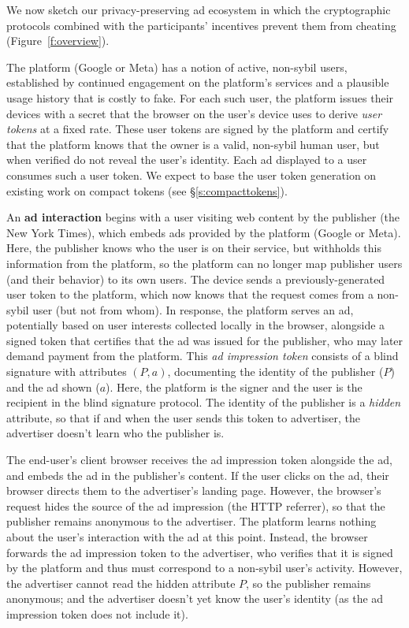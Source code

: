 %
We now sketch our privacy-preserving ad ecosystem in which the cryptographic protocols combined with the participants' incentives prevent them from cheating (Figure~\ref{f:overview}).
%

%
The platform (\eg Google or Meta) has a notion of active, non-sybil users, established \eg by continued engagement on the platform's services and a plausible usage history that is costly to fake.
%
For each such user, the platform issues their devices with a secret that the browser on the user's device uses to derive \emph{user tokens} at a fixed rate.
%
These user tokens are signed by the platform and certify that the platform knows that the owner is a valid, non-sybil human user, but when verified do not reveal the user's identity.
%
Each ad displayed to a user consumes such a user token.
%
We expect to base the user token generation on existing work on compact tokens (see \S\ref{s:compacttokens}).
%

%
An \textbf{ad interaction} begins with a user visiting web content by the publisher (\eg the New York Times), which embeds ads provided by the platform (\eg Google or Meta).
%
Here, the publisher knows who the user is on their service, but withholds this information from the platform, so the platform can no longer map publisher users (and their behavior) to its own users.
%
The device sends a previously-generated user token to the platform, which now knows that the request comes from a non-sybil user (but not from whom).
%
In response, the platform serves an ad, potentially based on user interests collected locally in the browser, alongside a signed token that certifies that the ad was issued for the publisher, who may later demand payment from the platform.
%
This \emph{ad impression token} consists of a blind signature with attributes $(P, a)$, documenting the identity of the publisher ($P$) and the ad shown ($a$).
%
Here, the platform is the signer and the user is the recipient in the blind signature protocol.
%
The identity of the publisher is a \emph{hidden} attribute, so that if and when the user sends this token to advertiser, the advertiser doesn't learn who the publisher is.%
%

%
The end-user's client browser receives the ad impression token alongside the ad, and embeds the ad in the publisher's content.
%
If the user clicks on the ad, their browser directs them to the advertiser's landing page.
%
However, the browser's request hides the source of the ad impression (\eg the HTTP referrer), so that the publisher remains anonymous to the advertiser.
%
The platform learns nothing about the user's interaction with the ad at this point.
%
Instead, the browser forwards the ad impression token to the advertiser, who verifies that it is signed by the platform and thus must correspond to a non-sybil user's activity.
%
However, the advertiser cannot read the hidden attribute $P$, so the publisher remains anonymous; and the advertiser doesn't yet know the user's identity (as the ad impression token does not include it).
%

